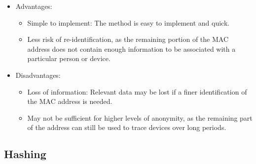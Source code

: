 \documentclass{article}
\begin{document}
  \begin{itemize}
    \item Advantages:
      \begin{itemize}
      \item Simple to implement: The method is easy to implement and quick.
      \item Less risk of re-identification, as the remaining portion of the MAC address does not contain enough information to be associated with a particular person or device.
      \end{itemize}
    \item Disadvantages:
      \begin{itemize}
      \item Loss of information: Relevant data may be lost if a finer identification of the MAC address is needed.
      \item May not be sufficient for higher levels of anonymity, as the remaining part of the address can still 
        be used to trace devices over long periods.
      \end{itemize}
  \end{itemize}



  \subsection{\label{subsec:Hashing}Hashing}


\end{document}
